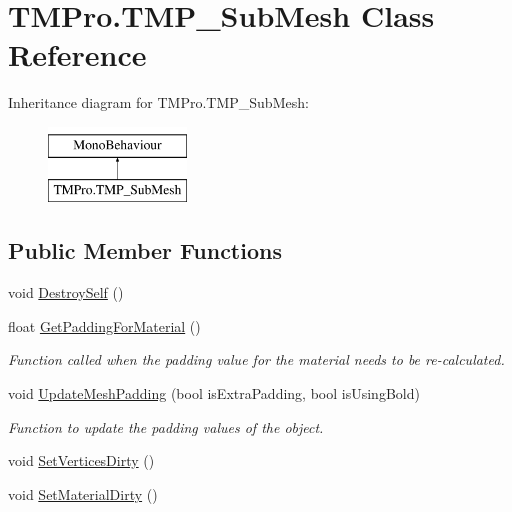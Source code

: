 \hypertarget{class_t_m_pro_1_1_t_m_p___sub_mesh}{}\section{T\+M\+Pro.\+T\+M\+P\+\_\+\+Sub\+Mesh Class Reference}
\label{class_t_m_pro_1_1_t_m_p___sub_mesh}
Inheritance diagram for T\+M\+Pro.\+T\+M\+P\+\_\+\+Sub\+Mesh\+:\begin{figure}[H]
\begin{center}
\leavevmode
\includegraphics[height=2.000000cm]{class_t_m_pro_1_1_t_m_p___sub_mesh}
\end{center}
\end{figure}
\subsection*{Public Member Functions}
\begin{DoxyCompactItemize}
\item 
void \mbox{\hyperlink{class_t_m_pro_1_1_t_m_p___sub_mesh_a373007bf6b71e0134f7f3980f841775b}{Destroy\+Self}} ()
\item 
float \mbox{\hyperlink{class_t_m_pro_1_1_t_m_p___sub_mesh_a9bcd237fd39eccac2018a497412504ed}{Get\+Padding\+For\+Material}} ()
\begin{DoxyCompactList}\small\item\em Function called when the padding value for the material needs to be re-\/calculated. \end{DoxyCompactList}\item 
void \mbox{\hyperlink{class_t_m_pro_1_1_t_m_p___sub_mesh_a5a77ba8ab35cf4a0570069b95527cbff}{Update\+Mesh\+Padding}} (bool is\+Extra\+Padding, bool is\+Using\+Bold)
\begin{DoxyCompactList}\small\item\em Function to update the padding values of the object. \end{DoxyCompactList}\item 
void \mbox{\hyperlink{class_t_m_pro_1_1_t_m_p___sub_mesh_a130186768b0a54f84638d3b90d3f26a7}{Set\+Vertices\+Dirty}} ()
\item 
void \mbox{\hyperlink{class_t_m_pro_1_1_t_m_p___sub_mesh_a8df49466a47cb2d29a910fb00dfa2af5}{Set\+Material\+Dirty}} ()
\end{DoxyCompactItemize}
